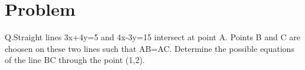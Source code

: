  \lstset{
frame=single, 
breaklines=true,
columns=fullflexible
}
\title{\mytitle}
\author{\myauthor\hspace{1em}\\\contact\\IITH\hspace{0.5em}-\hspace{0.5em}\mymodule}
\date{}
\hypersetup{pdfauthor=\myauthor,pdftitle=\mytitle,pdfkeywords=\mykeywords}
\sloppy

 \maketitle
 \tableofcontents
 
 \Large\section{Problem}
 Q.Straight lines 3x+4y=5 and 4x-3y=15 intersect at point A. Points B and C are choosen on these two lines such that AB=AC. Determine the possible equations of the line BC through the point (1,2).
 
